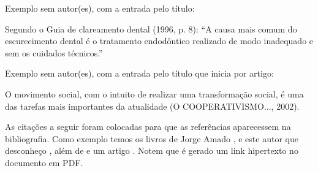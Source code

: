 {\color{red}
Exemplo sem autor(es), com a entrada pelo título:}

\bigskip

Segundo o Guia de clareamento dental (1996, p. 8): ``A causa mais comum do escurecimento dental é o tratamento endodôntico realizado de modo inadequado e sem os cuidados técnicos.''\\

\bigskip

{\color{red}
Exemplo sem autor(es), com a entrada pelo título que inicia por artigo:}

\bigskip

O movimento social, com o intuito de realizar uma transformação social, é uma das tarefas mais importantes da atualidade
(O COOPERATIVISMO..., 2002).\\

\bigskip

As citações a seguir foram colocadas para que as referências aparecessem na bibliografia. Como exemplo temos os livros de Jorge Amado \cite{book:AMADO}  \cite{book:AMADO2}, e este autor que desconheço \cite{book:JOHANSSON}, além de \cite{book:ENGEL} e um artigo \cite{art:PRADO}. Notem que é gerado um link hipertexto no documento em PDF.
